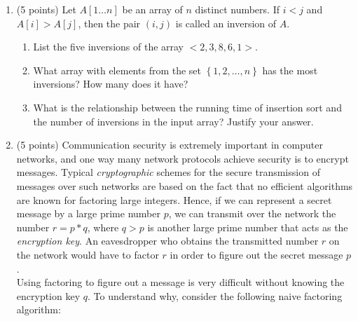 \documentclass[1]{cs430homework}
\begin{document}
\maketitle

\begin{enumerate}[label=\arabic*.]
    \item (5 points) Let $A[1 \dots n]$ be an array of $n$ distinct numbers. If $i < j$ and $A[i] > A[j]$, then the pair $(i, j)$ is called an inversion of $A$.\label{prb:1}
	\begin{enumerate}[label=\arabic{enumi}\alph*)]
	    \item List the five inversions of the array $<2, 3, 8, 6, 1>$.
		\item What array with elements from the set $\left\{1, 2, \dots, n\right\}$ has the most inversions? How many does it have?
		\item What is the relationship between the running time of insertion sort and the number of inversions in the input array? Justify your answer.
	\end{enumerate}
	\item (5 points) Communication security is extremely important in computer networks, and one way many network protocols achieve security is to encrypt messages. Typical \emph{cryptographic} schemes for the secure transmission of messages over such networks are based on the fact that no efficient algorithms are known for factoring large integers. Hence, if we can represent a secret message by a large prime number $p$, we can transmit over the network the number $r=p*q$, where $q>p$ is another large prime number that acts as the \emph{encryption key}. An eavesdropper who obtains the transmitted number $r$ on the network would have to factor $r$ in order to figure out the secret message $p$.\\

	Using factoring to figure out a message is very difficult without knowing the encryption key $q$. To understand why, consider the following naive factoring algorithm:


\end{enumerate}
\end{document}
